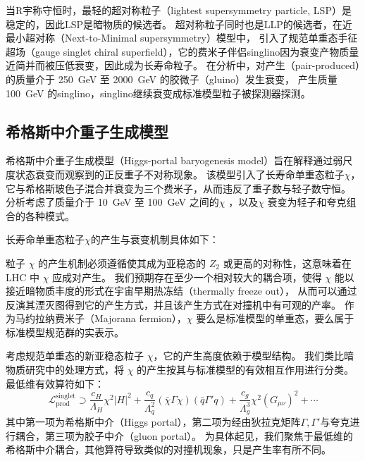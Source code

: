 当R宇称守恒时，最轻的超对称粒子（lightest supersymmetry particle, LSP）是稳定的，因此LSP是暗物质的候选者。
超对称粒子同时也是LLP的候选者，在近最小超对称（Next-to-Minimal supersymmetry）模型中，
引入了规范单重态手征超场（gauge singlet chiral superfield），它的费米子伴侣singlino因为衰变产物质量近简并而被压低衰变，因此成为长寿命粒子。
\cite{singlino}
在分析中，对产生（pair-produced）的质量介于 \SI{250}{GeV} 至 \SI{2000}{GeV} 的胶微子（gluino）发生衰变，
产生质量 \SI{100}{GeV} 的singlino，singlino继续衰变成标准模型粒子被探测器探测。


\subsection{希格斯中介重子生成模型}
希格斯中介重子生成模型（Higgs-portal baryogenesis model）旨在解释通过弱尺度状态衰变而观察到的正反重子不对称现象。
该模型引入了长寿命单重态粒子$\chi$，它与希格斯玻色子混合并衰变为三个费米子，从而违反了重子数与轻子数守恒。
分析考虑了质量介于 10~GeV 至 100~GeV 之间的$\chi$ ，以及$\chi$ 衰变为轻子和夸克组合的各种模式。

长寿命单重态粒子$\chi$的产生与衰变机制具体如下：
\cite{Cui_2015}

粒子 $\chi$ 的产生机制必须遵循使其成为亚稳态的 $Z_2$ 或更高的对称性，这意味着在 LHC 中 $\chi$ 应成对产生。
我们预期存在至少一个相对较大的耦合项，使得 $\chi$ 能以接近暗物质丰度的形式在宇宙早期热冻结（thermally freeze out），
从而可以通过反演其湮灭图得到它的产生方式，并且该产生方式在对撞机中有可观的产率。
作为马约拉纳费米子（Majorana fermion），$\chi$ 要么是标准模型的单重态，要么属于标准模型规范群的实表示。

考虑规范单重态的新亚稳态粒子 $\chi$，它的产生高度依赖于模型结构。
我们类比暗物质研究中的处理方式，将 $\chi$ 的产生按其与标准模型的有效相互作用进行分类。最低维有效算符如下：
\begin{equation}
    \mathcal{L}_{\text{prod}}^{\text{singlet}} \supset \frac{c_H}{\Lambda_H} \chi^2 |H|^2 +
    \frac{c_q}{\Lambda_q^2} (\bar{\chi} \Gamma \chi)(\bar{q} \Gamma' q) +
    \frac{c_g}{\Lambda_g^3} \chi^2 (G_{\mu\nu})^2 + \cdots
\end{equation}
其中第一项为希格斯中介（Higgs portal），第二项为经由狄拉克矩阵$\Gamma, \Gamma'$与夸克进行耦合，第三项为胶子中介（gluon portal）。
为具体起见，我们聚焦于最低维的希格斯中介耦合，其他算符导致类似的对撞机现象，只是产生率有所不同。

